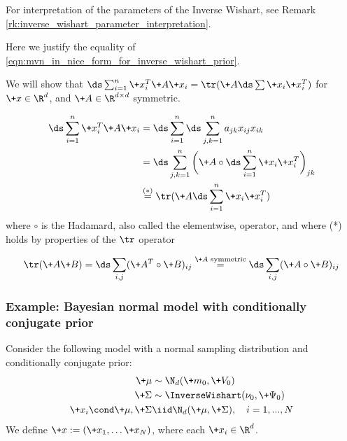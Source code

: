 \documentclass{article} %
\begin{document}
For interpretation of the parameters of the Inverse Wishart,  see Remark \ref{rk:inverse_wishart_parameter_interpretation}.

\begin{remark}{} 
\label{rk:reexpressing_mvn_in_nice_form_for_inverse_wishart_prior}

Here we justify the equality of \eqref{eqn:mvn_in_nice_form_for_inverse_wishart_prior}.

We will show that $\ds\sum_{i=1}^n \+x_i^T \+A \+x_i = \tr(\+A \ds\sum \+x_i \+x_i^T)$ for $\+x \in \R^d$,  and $\+A \in \R^{d \times d}$ symmetric.

\begin{align*}
\ds\sum_{i=1}^n \+x_i^T \+A \+x_i  &= \ds\sum_{i=1}^n \ds\sum_{j,k=1}^n a_{jk} x_{ij} x_{ik} \\
& = \ds\sum_{j,k=1}^n \bigg( \+A \circ \ds\sum_{i=1}^n \+x_i \+x_i^T \bigg)_{jk} \\
& \stackrel{(*)}{=} \tr (\+A \ds\sum_{i=1}^n \+x_i \+x_i^T) 
\end{align*}
where $\circ$ is the Hadamard,  also called the elementwise,  operator,  and where (*) holds by properties of the $\tr$ operator

\[ \tr(\+A\+B) = \ds\sum_{i,j} (\+A^T \circ \+B)_{ij}  \stackrel{\text{$\+A$ symmetric}}{=}  \ds\sum_{i,j} (\+A \circ \+B)_{ij}\]

\end{remark}

\subsubsection{Example:  Bayesian normal model with conditionally conjugate prior} \label{sec:normal_data_with_non_conjugate_prior}

Consider the following model with a normal sampling distribution and conditionally conjugate prior:
\begin{align*}
\+\mu &\sim \N_{d}(\+m_0,\+V_0 ) \\
\+\Sigma &\sim \InverseWishart(\nu_0,  \+\Psi_0) \\
\+x_i \cond \+\mu,  \+\Sigma &\iid \N_{d}( \+\mu , \+\Sigma), \quad i=1,...,N
\end{align*}
We define $\+x := (\+x_1,  \hdots \+x_N)$,  where each $\+x_i \in \R^d$.
\end{document}
